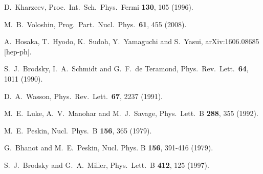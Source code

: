 \documentclass[prd,amsmath,twocolumn,floatfix,amssymb, preprintnumbers, linenumbers,nofootinbib, superscriptaddress]{revtex4}
\begin{document}
\begin{thebibliography}{99}

  D.~Kharzeev,
  Proc.\ Int.\ Sch.\ Phys.\ Fermi {\bf 130}, 105 (1996).

  M.~B.~Voloshin,
  Prog.\ Part.\ Nucl.\ Phys.\  {\bf 61}, 455 (2008).
  
  A.~Hosaka, T.~Hyodo, K.~Sudoh, Y.~Yamaguchi and S.~Yasui,
  arXiv:1606.08685 [hep-ph].

  S.~J.~Brodsky, I.~A.~Schmidt and G.~F.~de Teramond,
  Phys.\ Rev.\ Lett.\  {\bf 64}, 1011 (1990).
  
  D.~A.~Wasson,
  Phys.\ Rev.\ Lett.\  {\bf 67}, 2237 (1991).
  
  M.~E.~Luke, A.~V.~Manohar and M.~J.~Savage,
  Phys.\ Lett.\ B {\bf 288}, 355 (1992). 

  M.~E.~Peskin,
  Nucl.\ Phys.\ B {\bf 156}, 365 (1979).

G.~Bhanot and M.~E.~Peskin,
Nucl. Phys. B \textbf{156}, 391-416 (1979).



  S.~J.~Brodsky and G.~A.~Miller,
  Phys.\ Lett.\ B {\bf 412}, 125 (1997).


\end{thebibliography}
\end{document}

